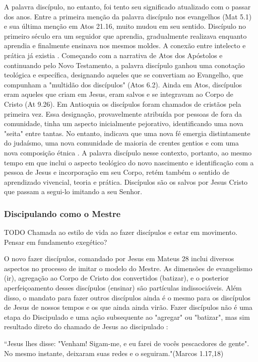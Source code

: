 \documentclass[
	12pt,				%
	openright,			%
	twoside,			%
	a4paper,			%
	english,			%
	french,				%
	spanish,			%
	brazil				%
	]{abntex2}
\begin{document}
A palavra discípulo, no entanto, foi tento seu significado atualizado com o passar dos anos. Entre a primeira menção da palavra discípulo nos evangelhos (Mat 5.1) e sua última menção em Atos 21.16, muito mudou em seu sentido. Discípulo no primeiro século era um seguidor que aprendia, gradualmente realizava enquanto aprendia e finalmente ensinava nos mesmos moldes. A conexão entre intelecto e prática já existia \cite[105]{wilkins}. Começando com a narrativa de Atos dos Apóstolos e continuando pelo Novo Testamento, a palavra discípulo ganhou uma conotação teológica e específica, designando aqueles que se convertiam ao Evangelho, que compunham a "multidão dos discípulos" (Atos 6.2). Ainda em Atos, discípulos eram aqueles que criam em Jesus, eram salvos e se integravam ao Corpo de Cristo (At 9.26)\cite[59-60]{brandao}. Em Antioquia os discípulos foram chamados de cristãos pela primeira vez. Essa designação, provavelmente atribuída por pessoas de fora da comunidade, tinha um aspecto inicialmente pejorativo, identificando uma nova "seita" entre tantas. No entanto, indicava que uma nova fé emergia distintamente do judaísmo, uma nova comunidade de maioria de crentes gentios e com uma nova composição étnica \cite[90]{wan}. A palavra discípulo nesse contexto, portanto, ao mesmo tempo em que inclui o aspecto teológico do novo nascimento e identificação com a pessoa de Jesus e incorporação em seu Corpo, retém também o sentido de aprendizado vivencial, teoria e prática. Discípulos são os salvos por Jesus Cristo que passam a segui-lo imitando a seu Senhor.

\subsubsection{Discipulando como o Mestre}

TODO Chamada ao estilo de vida ao fazer discípulos e estar em movimento. Pensar em fundamento exegético?

O novo fazer discípulos, comandado por Jesus em Mateus 28 inclui diversos aspectos no processo de imitar o modelo do Mestre. As dimensões de evangelismo (ir), agregação ao Corpo de Cristo dos convertidos (batizar), e o posterior aperfeiçoamento desses discípulos (ensinar) são partículas indissociáveis. Além disso, o mandato para fazer outros discípulos ainda é o mesmo para os discípulos de Jesus de nossos tempos e os que ainda ainda virão. Fazer discípulos não é uma etapa do Discipulado e uma ação subsequente ao "agregar" ou "batizar", mas sim resultado direto do chamado de Jesus ao discipulado \cite[64]{brandao}:
\begin{citacao}“Jesus lhes disse: "Venham! Sigam-me, e eu farei de vocês pescacdores de gente". No mesmo instante, deixaram suas redes e o seguiram."(Marcos 1.17,18)
\end{citacao}
\end{document}
